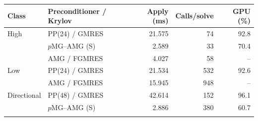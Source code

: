 \begin{tabular}{llrrr}
\toprule
Class & Preconditioner / Krylov & Apply (ms) & Calls/solve & GPU (\%) \\
\midrule
High & PP(24) / GMRES & 21.575 & 74 & 92.8 \\
 & $p$MG–AMG (S) & 2.589 & 33 & 70.4 \\
 & AMG / FGMRES & 4.027 & 58 & -- \\
\addlinespace[2pt]
Low & PP(24) / GMRES & 21.534 & 532 & 92.6 \\
 & AMG / FGMRES & 15.945 & 948 & -- \\
\addlinespace[2pt]
Directional & PP(48) / GMRES & 42.614 & 152 & 96.1 \\
 & $p$MG–AMG (S) & 2.886 & 380 & 60.7 \\
\addlinespace[2pt]
\bottomrule
\end{tabular}
